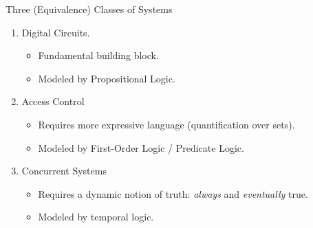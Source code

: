 \documentclass[style=sailor,size=12pt]{powerdot}
\begin{document}
\begin{wideslide}[bm=,toc=]{Three (Equivalence) Classes of Systems} 

\begin{enumerate}
\item Digital Circuits. 
\begin{itemize}
\item<2-> Fundamental building block.
\item<2-> Modeled by Propositional Logic. 
\end{itemize}
\item Access Control
\begin{itemize}
\item<3-> Requires more expressive language (quantification over sets).
\item<3-> Modeled by First-Order Logic / Predicate Logic. 
\end{itemize}
\item Concurrent Systems 
\begin{itemize}
\item<4-> Requires a dynamic notion of truth: \emph{always} and \emph{eventually} true.
\item<4-> Modeled by temporal logic.
\end{itemize}
\end{enumerate}
\end{wideslide}
\end{document}
